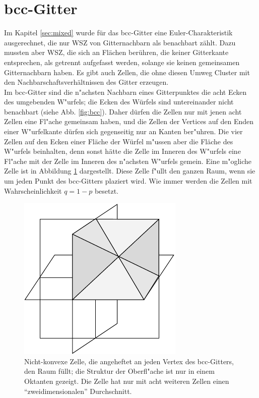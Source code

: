 \section{bcc-Gitter}
\label{sec:appbcc}
Im Kapitel \ref{sec:mixed} wurde f\"ur das bcc-Gitter eine Euler-Charakteristik ausgerechnet, die nur WSZ von Gitternachbarn als benachbart z\"ahlt. Dazu mussten aber WSZ, die sich an Fl\"achen ber\"uhren, die keiner Gitterkante entsprechen, als getrennt aufgefasst werden, solange sie keinen gemeinsamen Gitternachbarn haben. Es gibt auch Zellen, die ohne diesen Umweg Cluster mit den Nachbarschaftsverh\"altnissen des Gitter erzeugen. 
\\Im bcc-Gitter sind die n"achsten Nachbarn eines Gitterpunktes die acht Ecken des umgebenden W"urfels; die Ecken des W\"urfels sind untereinander nicht benachbart (siehe Abb. \ref{fig:bcc}). Daher d\"urfen die Zellen nur mit jenen acht Zellen eine Fl"ache gemeinsam haben, und die Zellen der Vertices auf den Enden einer W"urfelkante d\"urfen sich gegenseitig nur an Kanten ber"uhren. Die vier Zellen auf den Ecken einer Fl\"ache der W\"urfel m"ussen aber die Fl\"ache des W"urfels beinhalten, denn sonst h\"atte die Zelle im Inneren des W"urfels eine Fl"ache mit der Zelle im Inneren des n"achsten W"urfels gemein. Eine m"ogliche Zelle ist in Abbildung \ref{fig:bcc_nonconvex_app} dargestellt. Diese Zelle f"ullt den ganzen Raum, wenn sie um jeden Punkt des bcc-Gitters plaziert wird. Wie immer werden die Zellen mit Wahrscheinlichkeit $q=1-p$ besetzt.
\begin{figure} [htpb]
\centering
\includegraphics{./Fluct_topo-Figs/bcc-zelle}
\caption{Nicht-konvexe Zelle, die angeheftet an jeden Vertex des bcc-Gitters, den Raum f\"ullt; die Struktur der Oberfl"ache ist nur in einem Oktanten gezeigt. Die Zelle hat nur mit acht weiteren Zellen einen ``zweidimensionalen'' Durchschnitt.}
\label{fig:bcc_nonconvex_app}
\end{figure}
